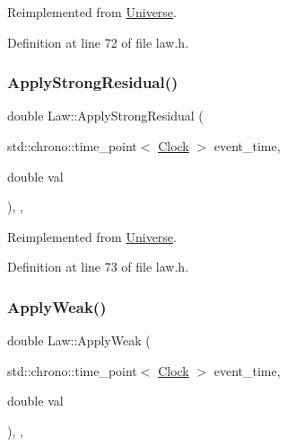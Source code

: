 Reimplemented from \mbox{\hyperlink{class_universe_a62789bcff84bd750b0366004381e2fdd}{Universe}}.



Definition at line 72 of file law.\+h.

\mbox{\label{class_law_a266f86cdcc01e813249a2f192ab85eb3}} 
\subsubsection{\texorpdfstring{Apply\+Strong\+Residual()}{ApplyStrongResidual()}}
{\footnotesize\ttfamily double Law\+::\+Apply\+Strong\+Residual (\begin{DoxyParamCaption}\item[{std\+::chrono\+::time\+\_\+point$<$ \mbox{\hyperlink{universe_8h_a0ef8d951d1ca5ab3cfaf7ab4c7a6fd80}{Clock}} $>$}]{event\+\_\+time,  }\item[{double}]{val }\end{DoxyParamCaption})\hspace{0.3cm}{\ttfamily [inline]}, {\ttfamily [final]}, {\ttfamily [virtual]}}



Reimplemented from \mbox{\hyperlink{class_universe_af7becebb347be9a85541d96a3eca1ca7}{Universe}}.



Definition at line 73 of file law.\+h.

\mbox{\label{class_law_a96ddd42403e3665c6070283ac201658d}} 
\subsubsection{\texorpdfstring{Apply\+Weak()}{ApplyWeak()}}
{\footnotesize\ttfamily double Law\+::\+Apply\+Weak (\begin{DoxyParamCaption}\item[{std\+::chrono\+::time\+\_\+point$<$ \mbox{\hyperlink{universe_8h_a0ef8d951d1ca5ab3cfaf7ab4c7a6fd80}{Clock}} $>$}]{event\+\_\+time,  }\item[{double}]{val }\end{DoxyParamCaption})\hspace{0.3cm}{\ttfamily [inline]}, {\ttfamily [final]}, {\ttfamily [virtual]}}



